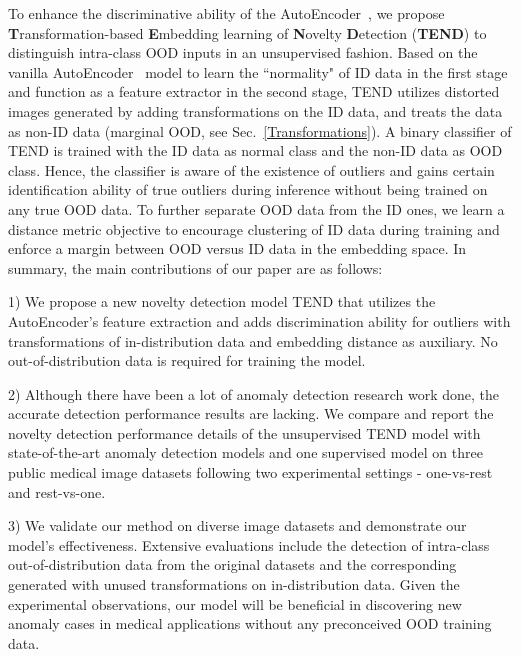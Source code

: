 \documentclass[12pt]{spieman}  %
\begin{document}
\begin{spacing}{2}
To enhance the discriminative ability of the AutoEncoder~\cite{mcclelland1986parallel}, we propose \textbf{T}ransformation-based \textbf{E}mbedding learning of \textbf{N}ovelty \textbf{D}etection (\textbf{TEND}) to distinguish intra-class OOD inputs in an unsupervised fashion. 
Based on the vanilla AutoEncoder~\cite{mcclelland1986parallel} model to learn the ``normality" of ID data in the first stage and function as a feature extractor in the second stage, TEND utilizes distorted images generated by adding transformations on the ID data, and treats the data as non-ID data (marginal OOD, see Sec.~\ref{Transformations}). A binary classifier of TEND is trained with the ID data as normal class and the  non-ID data as OOD class. Hence, the classifier is aware of the existence of outliers and gains certain identification ability of true outliers during inference without being trained on any true OOD data. To further separate OOD data from the ID ones, we learn a distance metric objective to encourage clustering of ID data during training  and enforce a margin between OOD versus ID data in the embedding space.
In summary, the main contributions of our paper are as follows:

1) We propose a new novelty detection model TEND that utilizes the AutoEncoder's feature extraction and adds discrimination ability for outliers with transformations of in-distribution data and embedding distance as auxiliary. No out-of-distribution data is required for training the model.

2) Although there have been a lot of anomaly detection research work done, the accurate detection performance results are lacking.
We compare and report the novelty detection performance details of the unsupervised TEND model with state-of-the-art anomaly detection models and one supervised model on three public medical image datasets following two experimental settings - one-vs-rest and rest-vs-one.  

3) We validate our method on diverse image datasets and demonstrate our model's effectiveness. Extensive evaluations include the detection of intra-class out-of-distribution data from the original datasets and the corresponding generated with unused transformations on in-distribution data. Given the experimental observations, our model will be beneficial in discovering new anomaly cases in medical applications without any preconceived OOD training data. 


\end{spacing}
\end{document}
